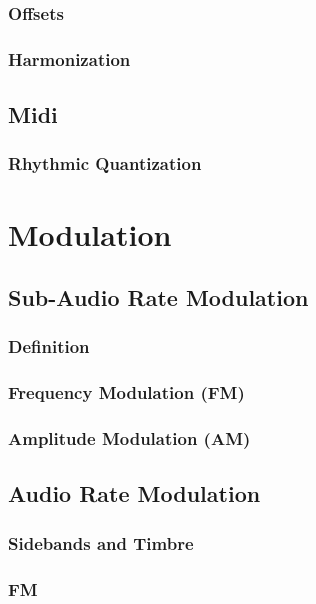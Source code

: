\documentclass[11pt]{article}
\begin{document}
\subsubsection{Offsets}
\label{sec:orgd01df69}
\subsubsection{Harmonization}
\label{sec:org829b5a2}
\subsection{Midi}
\label{sec:org4918a72}
\subsubsection{Rhythmic Quantization}
\label{sec:org6cb4663}

\section{Modulation}
\label{sec:orgb763e4f}
\subsection{Sub-Audio Rate Modulation}
\label{sec:org152b0f2}
\subsubsection{Definition}
\label{sec:orgad81fc9}
\subsubsection{Frequency Modulation (FM)}
\label{sec:org4e7fe77}
\subsubsection{Amplitude Modulation (AM)}
\label{sec:orgdddca22}
\subsection{Audio Rate Modulation}
\label{sec:org0b31587}
\subsubsection{Sidebands and Timbre}
\label{sec:orga8ed470}
\subsubsection{FM}
\label{sec:orgd70b1da}
\end{document}
